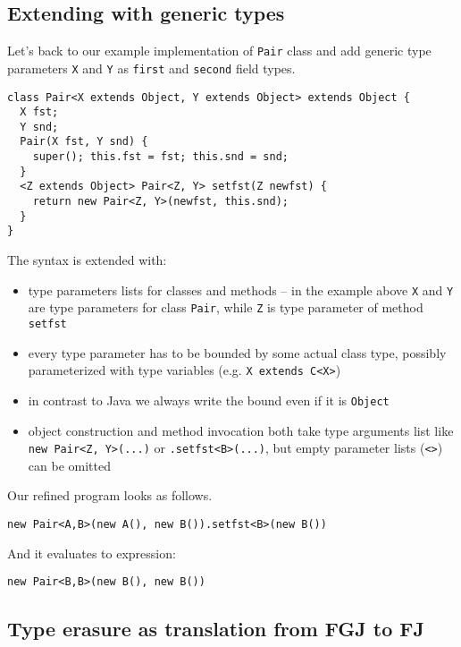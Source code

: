 \documentclass{article}[12pt]
\begin{document}
\subsection{Extending with generic types}

Let's back to our example implementation of \texttt{Pair} class and
add generic type parameters \texttt{X} and \texttt{Y} as
\texttt{first} and \texttt{second} field types.

\begin{verbatim}
class Pair<X extends Object, Y extends Object> extends Object {
  X fst;
  Y snd;
  Pair(X fst, Y snd) {
    super(); this.fst = fst; this.snd = snd;
  }
  <Z extends Object> Pair<Z, Y> setfst(Z newfst) {
    return new Pair<Z, Y>(newfst, this.snd);
  }
}
\end{verbatim}
The syntax is extended with:

\begin{itemize}
\item type parameters lists for classes and methods -- in the example
  above \texttt{X} and \texttt{Y} are type parameters for class
  \texttt{Pair}, while \texttt{Z} is type parameter of method
  \texttt{setfst}
\item every type parameter has to be bounded by some actual class
  type, possibly parameterized with type variables (e.g.
  \texttt{X extends C<X>})
\item in contrast to Java we always write the bound even if it
  is \texttt{Object}
\item object construction and method invocation both take
  type arguments list like \texttt{new Pair<Z, Y>(...)} or
  \texttt{.setfst<B>(...)}, but empty parameter lists (\texttt{<>})
  can be omitted
\end{itemize}
Our refined program looks as follows.

\begin{verbatim}
new Pair<A,B>(new A(), new B()).setfst<B>(new B())
\end{verbatim}
And it evaluates to expression:
\begin{verbatim}
new Pair<B,B>(new B(), new B())
\end{verbatim}

\subsection{Type erasure as translation from FGJ to FJ}
\end{document}
